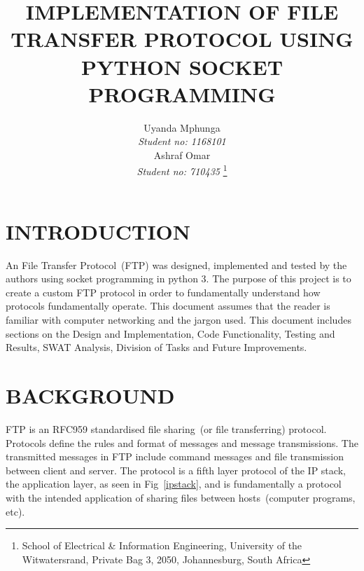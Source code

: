 \documentclass[journal, a4paper]{IEEEtran}
\begin{document}
\title{IMPLEMENTATION OF FILE TRANSFER PROTOCOL USING PYTHON SOCKET PROGRAMMING}

\author{Uyanda Mphunga \\ \textit{Student no: 1168101}\\ Ashraf Omar\\ \textit{Student no: 710435}
	\thanks{School of Electrical \& Information Engineering, University of the
		Witwatersrand, Private Bag 3, 2050, Johannesburg, South Africa}
}


%



\maketitle
\thispagestyle{empty}\pagestyle{empty}

\newlength\tindent
\setlength{\tindent}{\parindent}
\setlength{\parindent}{0pt}
\renewcommand{\indent}{\hspace*{\tindent}}

\begin{abstract}
	
\end{abstract}

%
\section{INTRODUCTION}
An File Transfer Protocol~(FTP) was designed, implemented and tested by the authors using socket programming in python 3. The purpose of this project is to create a custom FTP protocol in order to fundamentally understand how protocols fundamentally operate. This document assumes that the reader is familiar with computer networking and the jargon used. This document includes sections on the Design and Implementation, Code Functionality, Testing and Results, SWAT Analysis, Division of Tasks and Future Improvements. 

\section{BACKGROUND}
FTP is an RFC959 standardised file sharing~(or file transferring) protocol. Protocols define the rules and format of messages and message transmissions. The transmitted messages in FTP include command messages and file transmission between client and server. The protocol is a fifth layer protocol of the IP stack, the application layer, as seen in Fig~\ref{ipstack}, and is fundamentally a protocol with the intended application of sharing files between hosts~(computer programs, etc). 
\end{document}
